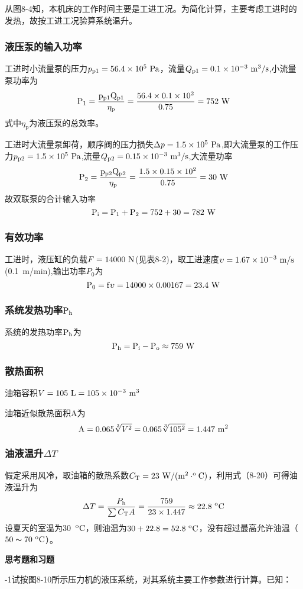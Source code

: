 \documentclass[cn,11pt,chinese]{elegantbook}
\begin{document}
从图8-4知，本机床的工作时间主要是工进工况。为简化计算，主要考虑工进时的发热，故按工进工况验算系统温升。

\subsubsection{液压泵的输入功率}

工进时小流量泵的压力$p_\text{p1}=56.4\times10^5\rm \ Pa$，流量$Q_\text{p1}=0.1\times10^{-3} \rm \ m^3/s$,小流量泵功率为
\[
\rm P_1=\frac{p_\text{p1}Q_\text{p1}}{\eta_\text{p}}=\frac{56.4\times0.1\times10^2}{0.75}=752\  \rm W
\]
式中$\eta_\text{p}$为液压泵的总效率。

工进时大流量泵卸荷，顺序阀的压力损失$\Delta p=1.5\times10^5\rm \ Pa$,即大流量泵的工作压力$p_\text{p2}=1.5\times10^5\rm \ Pa$,流量$Q_\text{p2}=0.15\times10^{-3}\rm \ m^3/s$,大流量功率
\[
\rm P_2=\frac{p_\text{p2} Q_\text{p2}}{\eta_\text{p}}=\frac{1.5\times0.15\times10^2}{0.75}=30\rm \ W
\]
故双联泵的合计输入功率
\[
\rm P_i=\rm P_1+\rm P_2=752+30=782\rm \ W
\]
\subsubsection{有效功率}

工进时，液压缸的负载$F=14000\rm \ N $(见表8-2)，取工进速度$\upsilon=1.67\times10^{-3} \rm \ m/s$(0.1\ m/min),输出功率$P_0$为
\[
\rm P_0=f\upsilon=14000\times0.00167=23.4\rm \ W
\]
\subsubsection{系统发热功率$\rm P_\text{h}$}

系统的发热功率$\rm P_\text{h}$为
\[
\rm P_\text{h}=\rm P_\text{i}-\rm P_\text{o} \approx 759\rm \ W
\]
\subsubsection{散热面积}

油箱容积$V=105\rm \ L=105\times10^{-3}\rm \  m^3$

油箱近似散热面积A为
\[
\rm A=0.065\sqrt[3]{V^2}=0.065\sqrt[3]{105^2
}=1.447\rm \ m^2
\]
\subsubsection{油液温升$\Delta T$}

假定采用风冷，取油箱的散热系数$C_\text{T}=23\rm \ W/(m^2\cdot ^\text{o} \rm C)$，利用式（8-20）可得油液温升为
\begin{equation}
\Delta T=\frac{P_\text{h}}{\sum C_\text{T} A}=\frac{759}{23\times1.447}\approx22.8 \  ^\text{o} \rm C
\end{equation}
设夏天的室温为30\ $ ^\text{o} \rm C$，则油温为$30+22.8=52.8\  ^\text{o} \rm C$，没有超过最高允许油温（$50\thicksim70\  ^\text{o} \rm C$）。
\begin{center}
\textbf{思考题和习题}
\end{center}
-1\qquad 试按图8-10所示压力机的液压系统，对其系统主要工作参数进行计算。已知：
\end{document}
